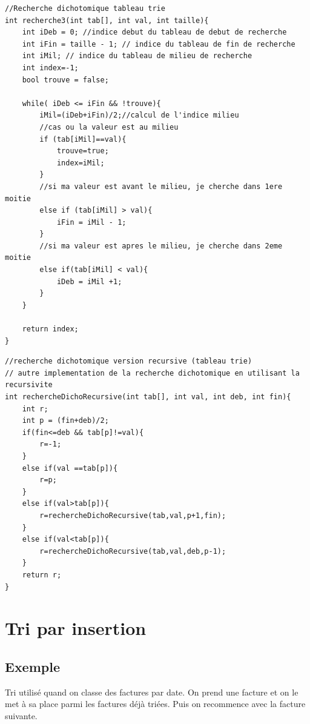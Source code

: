 \documentclass[french]{article}
\begin{document}
		\begin{lstlisting}[caption={Recherche dichotomique tableau trie}]
//Recherche dichotomique tableau trie
int recherche3(int tab[], int val, int taille){
    int iDeb = 0; //indice debut du tableau de debut de recherche
    int iFin = taille - 1; // indice du tableau de fin de recherche
    int iMil; // indice du tableau de milieu de recherche
    int index=-1;
    bool trouve = false;
    
    while( iDeb <= iFin && !trouve){
        iMil=(iDeb+iFin)/2;//calcul de l'indice milieu
        //cas ou la valeur est au milieu
        if (tab[iMil]==val){
            trouve=true;
            index=iMil;
        }
        //si ma valeur est avant le milieu, je cherche dans 1ere moitie
        else if (tab[iMil] > val){
            iFin = iMil - 1;
        }
        //si ma valeur est apres le milieu, je cherche dans 2eme moitie
        else if(tab[iMil] < val){
            iDeb = iMil +1;
        }
    }
    
    return index;
}

	\end{lstlisting}
	
			\begin{lstlisting}[caption={Recherche dichotomique récursive dans tableau trie}]
//recherche dichotomique version recursive (tableau trie)
// autre implementation de la recherche dichotomique en utilisant la recursivite
int rechercheDichoRecursive(int tab[], int val, int deb, int fin){
    int r;
    int p = (fin+deb)/2;
    if(fin<=deb && tab[p]!=val){
        r=-1;
    }
    else if(val ==tab[p]){
        r=p;
    }
    else if(val>tab[p]){
        r=rechercheDichoRecursive(tab,val,p+1,fin);
    }
    else if(val<tab[p]){
        r=rechercheDichoRecursive(tab,val,deb,p-1);
    }
    return r;
}
	\end{lstlisting}
	
\section{Tri par insertion}

\subsection*{Exemple}
Tri utilisé quand on classe des factures par date. On prend une facture et on le met à sa place parmi les factures déjà triées. Puis on recommence avec la facture suivante. 
\end{document}

